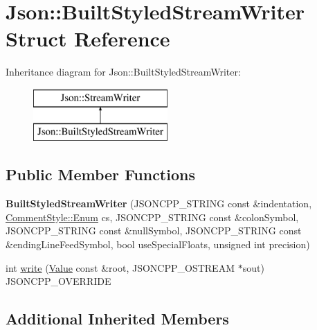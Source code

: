 \hypertarget{structJson_1_1BuiltStyledStreamWriter}{}\section{Json\+:\+:Built\+Styled\+Stream\+Writer Struct Reference}
\label{structJson_1_1BuiltStyledStreamWriter}
Inheritance diagram for Json\+:\+:Built\+Styled\+Stream\+Writer\+:\begin{figure}[H]
\begin{center}
\leavevmode
\includegraphics[height=2.000000cm]{structJson_1_1BuiltStyledStreamWriter}
\end{center}
\end{figure}
\subsection*{Public Member Functions}
\begin{DoxyCompactItemize}
\item 
{\bfseries Built\+Styled\+Stream\+Writer} (J\+S\+O\+N\+C\+P\+P\+\_\+\+S\+T\+R\+I\+NG const \&indentation, \hyperlink{structJson_1_1CommentStyle_a51fc08f3518fd81eba12f340d19a3d0c}{Comment\+Style\+::\+Enum} cs, J\+S\+O\+N\+C\+P\+P\+\_\+\+S\+T\+R\+I\+NG const \&colon\+Symbol, J\+S\+O\+N\+C\+P\+P\+\_\+\+S\+T\+R\+I\+NG const \&null\+Symbol, J\+S\+O\+N\+C\+P\+P\+\_\+\+S\+T\+R\+I\+NG const \&ending\+Line\+Feed\+Symbol, bool use\+Special\+Floats, unsigned int precision)\hypertarget{structJson_1_1BuiltStyledStreamWriter_adf11b7d1ee3c68d096b7c662ee85948e}{}\label{structJson_1_1BuiltStyledStreamWriter_adf11b7d1ee3c68d096b7c662ee85948e}

\item 
int \hyperlink{structJson_1_1BuiltStyledStreamWriter_a823cdb1afabb6b0d5f39bcd5a6a6f747}{write} (\hyperlink{classJson_1_1Value}{Value} const \&root, J\+S\+O\+N\+C\+P\+P\+\_\+\+O\+S\+T\+R\+E\+AM $\ast$sout) J\+S\+O\+N\+C\+P\+P\+\_\+\+O\+V\+E\+R\+R\+I\+DE
\end{DoxyCompactItemize}
\subsection*{Additional Inherited Members}


